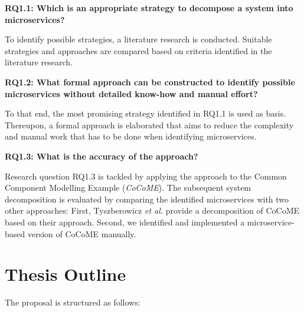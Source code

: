\vspace{0.5cm}
\noindent
\textbf{RQ1.1: Which is an appropriate strategy to decompose a system into microservices?}

\vspace{0.5cm}
\noindent
To identify possible strategies, a literature research is conducted. Suitable strategies and approaches are compared based on criteria identified in the literature research.
\vspace{0.5cm}

\noindent
\textbf{RQ1.2: What formal approach can be constructed to identify possible microservices without detailed know-how and manual effort?}

\vspace{0.5cm}
\noindent
To that end, the most promising strategy identified in RQ1.1 is used as basis. Thereupon, a formal approach is elaborated that aims to reduce the complexity and manual work that has to be done when identifying microservices.
\vspace{0.5cm}


\noindent
\textbf{RQ1.3: What is the accuracy of the approach?   }

\vspace{0.5cm}
\noindent
Research question RQ1.3 is tackled by applying the approach to the Common Component Modelling Example (\textit{CoCoME}). The subsequent system decomposition is evaluated by comparing the identified microservices with two other approaches: First, Tyszberowicz \textit{et al.} \cite{FunctionalDecompositionHeinrich} provide a decomposition of CoCoME based on their approach. Second, we identified and implemented a microservice-based version of CoCoME manually. 

\vspace{0.5cm}



\endgroup
\vspace{1cm}







\section{Thesis Outline}
\label{sec_Introduction:ThesisOutline}
The proposal is structured as follows:


